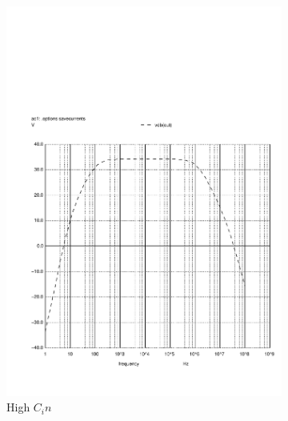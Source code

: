 \begin{figure}[H] 
\centering
\begin{subfigure}{0.3\textwidth}
\includegraphics[width=\textwidth]{c1high.pdf}
\caption{High $C_in$}
\label{highcin}
\end{subfigure}
\begin{subfigure}{0.3\textwidth}

\end{subfigure}
\end{figure}
